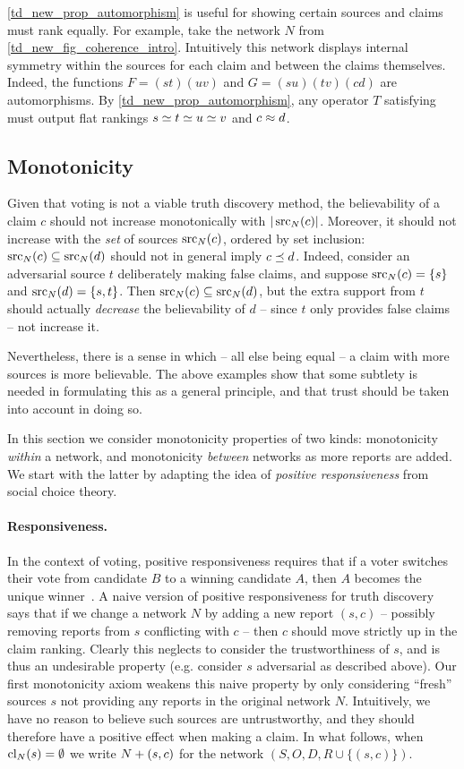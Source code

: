 \cref{td_new_prop_automorphism} is useful for showing certain sources and
claims must rank equally. For example, take the network $N$ from
\cref{td_new_fig_coherence_intro}. Intuitively this network displays internal
symmetry within the sources for each claim and between the claims themselves.
Indeed, the functions $F = (st)(uv)$ and $G = (su)(tv)(cd)$ are automorphisms.
By \cref{td_new_prop_automorphism}, any operator $T$ satisfying \symmetry{}
must output flat rankings $s \simeq t \simeq u \simeq v$ and $c \approx d$.

\subsection{Monotonicity}

Given that voting is not a viable truth discovery method, the believability of
a claim $c$ should not increase monotonically with $|\operatorname{src}_N(c)|$. Moreover, it
should not increase with the \emph{set} of sources $\operatorname{src}_N(c)$, ordered by set
inclusion: $\operatorname{src}_N(c) \subseteq \operatorname{src}_N(d)$ should not in general imply $c \preceq
d$. Indeed, consider an adversarial source $t$ deliberately making false
claims, and suppose $\operatorname{src}_N(c) = \{s\}$ and $\operatorname{src}_N(d) = \{s, t\}$. Then
$\operatorname{src}_N(c) \subseteq \operatorname{src}_N(d)$, but the extra support from $t$ should actually
\emph{decrease} the believability of $d$ -- since $t$ only provides false
claims -- not increase it.

Nevertheless, there is a sense in which -- all else being equal -- a claim with
more sources is more believable. The above examples show that some subtlety is
needed in formulating this as a general principle, and that trust should be
taken into account in doing so.

In this section we consider monotonicity properties of two kinds: monotonicity
\emph{within} a network, and monotonicity \emph{between} networks as more
reports are added. We start with the latter by adapting the idea of
\emph{positive responsiveness} from social choice theory.

\paragraph{Responsiveness.}

In the context of voting, positive responsiveness requires that if
a voter switches their vote from candidate $B$ to a winning candidate $A$, then
$A$ becomes the unique winner~\cite{zwicker2016voting}.
%
A naive version of positive responsiveness for truth discovery says that if we
change a network $N$ by adding a new report $(s, c)$ -- possibly removing
reports from $s$ conflicting with $c$ -- then $c$ should move strictly up in
the claim ranking. Clearly this neglects to consider the trustworthiness of
$s$, and is thus an undesirable property (e.g. consider $s$ adversarial as
described above). Our first monotonicity axiom weakens this naive property by
only considering ``fresh'' sources $s$ not providing any reports in the original
network $N$. Intuitively, we have no reason to believe such sources are
untrustworthy, and they should therefore have a positive effect when making a
claim.
%
In what follows, when $\operatorname{cl}_N(s) = \emptyset$ we write ${N} + ({s}, {c})$
for the network $(S, O, D, R \cup \{(s, c)\})$.

